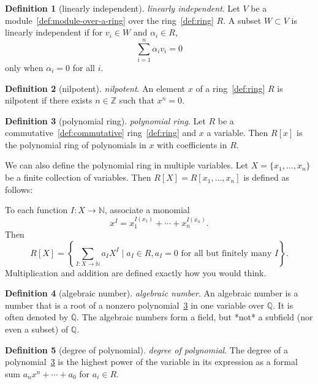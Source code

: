 \documentclass[12pt,a4paper]{article}
\theoremstyle{definition}
\newtheorem{definition}{Definition}
\begin{document}
\begin{definition}[linearly independent]\label{def:linearly-independent}
\emph{linearly independent}. Let $V$ be a module~\ref{def:module-over-a-ring} over the ring~\ref{def:ring} $R$. A subset $W \subset V$ is linearly independent if for $v_i \in W$ and $\alpha_i \in R$, $$\sum_{i=1}^n \alpha_i v_i=0$$ only when $\alpha_i = 0$ for all $i$.
\end{definition}

\begin{definition}[nilpotent]\label{def:nilpotent}
\emph{nilpotent}. An element $x$ of a ring~\ref{def:ring} $R$ is nilpotent if there exists $n \in \mathbb Z$ such that $x^n =0$.
\end{definition}

\begin{definition}[polynomial ring]\label{def:polynomial-ring}
\emph{polynomial ring}. Let $R$ be a commutative~\ref{def:commutative} ring~\ref{def:ring} and $x$ a variable. Then $R[x]$ is the polynomial ring of polynomials in $x$ with coefficients in $R$.

We can also define the polynomial ring in multiple variables. Let $X = \{x_1,\dots,x_n\}$ be a finite collection of variables. Then $R[X] = R[x_1,\dots,x_n]$ is defined as follows:

To each function $I:X\to \mathbb N$, associate a monomial $$x^I = x_1^{I(x_1)}+\cdots + x_n^{I(x_n)}.$$ Then $$R[X]= \left\{ \sum_{I:X\to \mathbb N} a_IX^I \mid a_I\in R, a_I = 0 \text{ for all but finitely many } I \right\}.$$ Multiplication and addition are defined exactly how you would think.
\end{definition}

\begin{definition}[algebraic number]\label{def:algebraic-number}
\emph{algebraic number}. An algebraic number is a number that is a root of a nonzero polynomial~\ref{def:polynomial-ring} in one variable over $\mathbb Q$. It is often denoted by $\overline{\mathbb Q}$. The algebraic numbers form a field, but *not* a subfield (nor even a subset) of $\mathbb Q$.
\end{definition}

\begin{definition}[degree of polynomial]\label{def:degree-of-polynomial}
\emph{degree of polynomial}. The degree of a polynomial~\ref{def:polynomial-ring} is the highest power of the variable in its expression as a formal sum $a_nx^n + \cdots + a_0$ for $a_i \in R$.
\end{definition}
\end{document}
